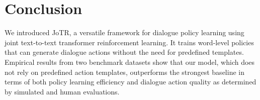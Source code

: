 \documentclass[letterpaper]{article} %
\begin{document}
\section{Conclusion}
We introduced JoTR, a versatile framework for dialogue policy learning using joint text-to-text transformer reinforcement learning. It trains word-level policies that can generate dialogue actions without the need for predefined templates. Empirical results from two benchmark datasets show that our model, which does not rely on predefined action templates, outperforms the strongest baseline in terms of both policy learning efficiency and dialogue action quality as determined by simulated and human evaluations.





\bigskip


\end{document}
